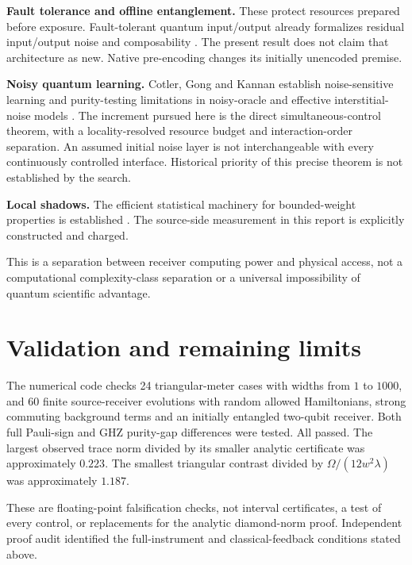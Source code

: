 \documentclass[11pt,a4paper]{article}
\begin{document}
\textbf{Fault tolerance and offline entanglement.} These protect resources prepared before exposure. Fault-tolerant quantum input/output already formalizes residual input/output noise and composability \cite{ftio}. The present result does not claim that architecture as new. Native pre-encoding changes its initially unencoded premise.

\textbf{Noisy quantum learning.} Cotler, Gong and Kannan establish noise-sensitive learning and purity-testing limitations in noisy-oracle and effective interstitial-noise models \cite{noisylearning}. The increment pursued here is the direct simultaneous-control theorem, with a locality-resolved resource budget and interaction-order separation. An assumed initial noise layer is not interchangeable with every continuously controlled interface. Historical priority of this precise theorem is not established by the search.

\textbf{Local shadows.} The efficient statistical machinery for bounded-weight properties is established \cite{shadows}. The source-side measurement in this report is explicitly constructed and charged.

This is a separation between receiver computing power and physical access, not a computational complexity-class separation or a universal impossibility of quantum scientific advantage.

\section{Validation and remaining limits}

The numerical code checks 24 triangular-meter cases with widths from $1$ to $1000$, and 60 finite source-receiver evolutions with random allowed Hamiltonians, strong commuting background terms and an initially entangled two-qubit receiver. Both full Pauli-sign and GHZ purity-gap differences were tested. All passed. The largest observed trace norm divided by its smaller analytic certificate was approximately $0.223$. The smallest triangular contrast divided by $\Omega/(12w^2\lambda)$ was approximately $1.187$.

These are floating-point falsification checks, not interval certificates, a test of every control, or replacements for the analytic diamond-norm proof. Independent proof audit identified the full-instrument and classical-feedback conditions stated above.
\end{document}
